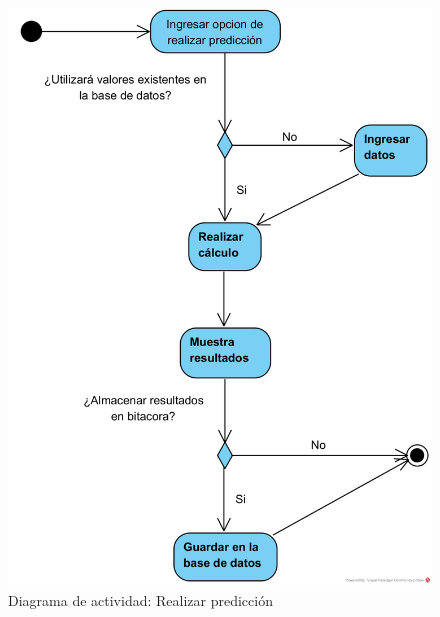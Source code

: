 \begin{figure}[!ht]
    \centering
    \includegraphics[scale=0.850]{TT/img/diseño/Realizar predicción DA.png}
    \caption{Diagrama de actividad: Realizar predicción}
    \label{graphic:DA-Realizar predicción}
\end{figure}




